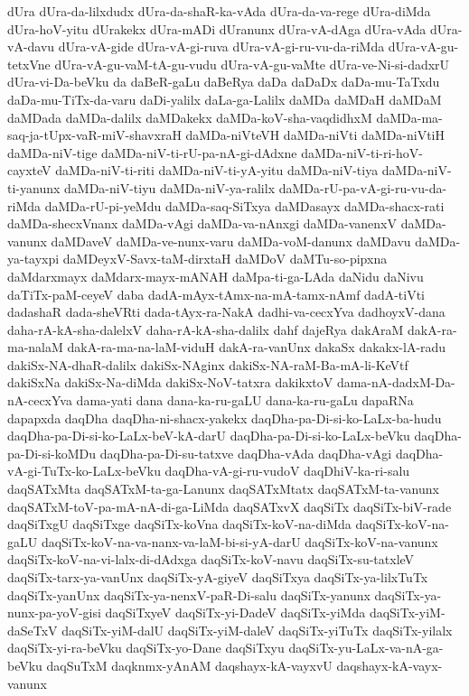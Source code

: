 {dUra
dUra-da-lilxdudx
dUra-da-shaR-ka-vAda
dUra-da-va-rege
dUra-diMda
dUra-hoV-yitu
dUrakekx
dUra-mADi
dUranunx
dUra-vA-dAga
dUra-vAda
dUra-vA-davu
dUra-vA-gide
dUra-vA-gi-ruva
dUra-vA-gi-ru-vu-da-riMda
dUra-vA-gu-tetxVne
dUra-vA-gu-vaM-tA-gu-vudu
dUra-vA-gu-vaMte
dUra-ve-Ni-si-dadxrU
dUra-vi-Da-beVku
da
daBeR-gaLu
daBeRya
daDa
daDaDx
daDa-mu-TaTxdu
daDa-mu-TiTx-da-varu
daDi-yalilx
daLa-ga-Lalilx
daMDa
daMDaH
daMDaM
daMDada
daMDa-dalilx
daMDakekx
daMDa-koV-sha-vaqdidhxM
daMDa-ma-saq-ja-tUpx-vaR-miV-shavxraH
daMDa-niVteVH
daMDa-niVti
daMDa-niVtiH
daMDa-niV-tige
daMDa-niV-ti-rU-pa-nA-gi-dAdxne
daMDa-niV-ti-ri-hoV-cayxteV
daMDa-niV-ti-riti
daMDa-niV-ti-yA-yitu
daMDa-niV-tiya
daMDa-niV-ti-yanunx
daMDa-niV-tiyu
daMDa-niV-ya-ralilx
daMDa-rU-pa-vA-gi-ru-vu-da-riMda
daMDa-rU-pi-yeMdu
daMDa-saq-SiTxya
daMDasayx
daMDa-shacx-rati
daMDa-shecxVnanx
daMDa-vAgi
daMDa-va-nAnxgi
daMDa-vanenxV
daMDa-vanunx
daMDaveV
daMDa-ve-nunx-varu
daMDa-voM-danunx
daMDavu
daMDa-ya-tayxpi
daMDeyxV-Savx-taM-dirxtaH
daMDoV
daMTu-so-pipxna
daMdarxmayx
daMdarx-mayx-mANAH
daMpa-ti-ga-LAda
daNidu
daNivu
daTiTx-paM-ceyeV
daba
dadA-mAyx-tAmx-na-mA-tamx-nAmf
dadA-tiVti
dadashaR
dada-sheVRti
dada-tAyx-ra-NakA
dadhi-va-cecxYva
dadhoyxV-dana
daha-rA-kA-sha-dalelxV
daha-rA-kA-sha-dalilx
dahf
dajeRya
dakAraM
dakA-ra-ma-nalaM
dakA-ra-ma-na-laM-viduH
dakA-ra-vanUnx
dakaSx
dakakx-lA-radu
dakiSx-NA-dhaR-dalilx
dakiSx-NAginx
dakiSx-NA-raM-Ba-mA-li-KeVtf
dakiSxNa
dakiSx-Na-diMda
dakiSx-NoV-tatxra
dakikxtoV
dama-nA-dadxM-Da-nA-cecxYva
dama-yati
dana
dana-ka-ru-gaLU
dana-ka-ru-gaLu
dapaRNa
dapapxda
daqDha
daqDha-ni-shacx-yakekx
daqDha-pa-Di-si-ko-LaLx-ba-hudu
daqDha-pa-Di-si-ko-LaLx-beV-kA-darU
daqDha-pa-Di-si-ko-LaLx-beVku
daqDha-pa-Di-si-koMDu
daqDha-pa-Di-su-tatxve
daqDha-vAda
daqDha-vAgi
daqDha-vA-gi-TuTx-ko-LaLx-beVku
daqDha-vA-gi-ru-vudoV
daqDhiV-ka-ri-salu
daqSATxMta
daqSATxM-ta-ga-Lanunx
daqSATxMtatx
daqSATxM-ta-vanunx
daqSATxM-toV-pa-mA-nA-di-ga-LiMda
daqSATxvX
daqSiTx
daqSiTx-biV-rade
daqSiTxgU
daqSiTxge
daqSiTx-koVna
daqSiTx-koV-na-diMda
daqSiTx-koV-na-gaLU
daqSiTx-koV-na-va-nanx-va-laM-bi-si-yA-darU
daqSiTx-koV-na-vanunx
daqSiTx-koV-na-vi-lalx-di-dAdxga
daqSiTx-koV-navu
daqSiTx-su-tatxleV
daqSiTx-tarx-ya-vanUnx
daqSiTx-yA-giyeV
daqSiTxya
daqSiTx-ya-lilxTuTx
daqSiTx-yanUnx
daqSiTx-ya-nenxV-paR-Di-salu
daqSiTx-yanunx
daqSiTx-ya-nunx-pa-yoV-gisi
daqSiTxyeV
daqSiTx-yi-DadeV
daqSiTx-yiMda
daqSiTx-yiM-daSeTxV
daqSiTx-yiM-dalU
daqSiTx-yiM-daleV
daqSiTx-yiTuTx
daqSiTx-yilalx
daqSiTx-yi-ra-beVku
daqSiTx-yo-Dane
daqSiTxyu
daqSiTx-yu-LaLx-va-nA-ga-beVku
daqSuTxM
daqknmx-yAnAM
daqshayx-kA-vayxvU
daqshayx-kA-vayx-vanunx
}
